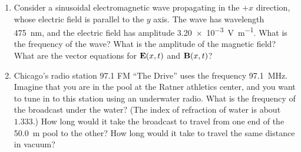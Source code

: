 \documentclass[11pt]{article}
\begin{document}
\begin{enumerate}

\newcommand{\vE}{\vb{E}}
\newcommand{\vB}{\vb{B}}
\newcommand{\Eamp}{\SI{3.20e-3}{\volt\per\meter}}
\newcommand{\wavel}{\SI{475}{\nano\meter}}

\item Consider a sinusoidal electromagnetic wave propagating in the $+x$ direction, whose electric field is parallel to the $y$ axis.  The wave has wavelength {\wavel}, and the electric field has amplitude {\Eamp}.  What is the frequency of the wave?  What is the amplitude of the magnetic field?  What are the vector equations for $\vE(x, t)$ and $\vB(x, t)$?



\newcommand{\freq}{\SI{97.1}{\mega\Hz}}
\newcommand{\length}{\SI{50.0}{\meter}}

\item Chicago's radio station 97.1 FM ``The Drive'' uses the frequency {\freq}.  Imagine that you are in the pool at the Ratner athletics center, and you want to tune in to this station using an underwater radio.  What is the frequency of the broadcast under the water?  (The index of refraction of water is about $1.333$.)  How long would it take the broadcast to travel from one end of the {\length} pool to the other?  How long would it take to travel the same distance in vacuum?

\end{enumerate}
\end{document}
